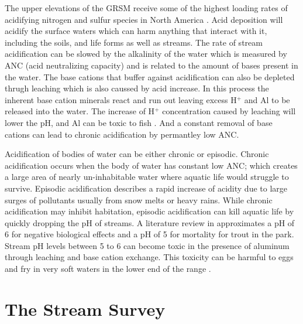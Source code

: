 The upper elevations of the GRSM receive some of the highest loading rates of acidifying nitrogen and sulfur species in North America \citep{johnson1992atmospheric}.  
Acid deposition will acidify the surface waters which can harm anything that interact with it, including the soils, and life forms as well as streams.
The rate of stream acidification can be slowed by the alkalinity of the water which is measured by ANC (acid neutralizing capacity) and is related to the amount of bases present in the water.
The base cations that buffer against acidification can also be depleted thrugh leaching which is also caussed by acid increase.
In this process the inherent base cation minerals react and run out leaving excess H$^+$ and Al to be released into the water\citep{sullivan2004}.
The increase of H$^+$ concentration caused by leaching will lower the pH, and Al can be toxic to fish \citep{driscoll2003effects}.
And a constant removal of base cations can lead to chronic acidification by permantley low ANC.

Acidification of bodies of water can be either chronic or episodic. 
Chronic acidification occurs when the body of water has constant low ANC; which creates a large area of  nearly un-inhabitable water where aquatic life would struggle to survive. 
Episodic acidification describes a rapid increase of acidity due to large surges of pollutants usually from snow melts or heavy rains.  
While chronic acidification may inhibit habitation, episodic acidification can kill aquatic life by quickly dropping the pH of streams.
A literature review in \citet{neff2009physiological} approximates a pH of 6 for negative biological effects and a pH of 5 for mortality for trout in the park.  
Stream pH levels between 5 to 6 can become toxic in the presence of aluminum through leaching and base cation exchange.
This toxicity can be harmful to eggs and fry in very soft waters in the lower end of the range \citep{robinson2008ph}.  


\section{The Stream Survey} %

